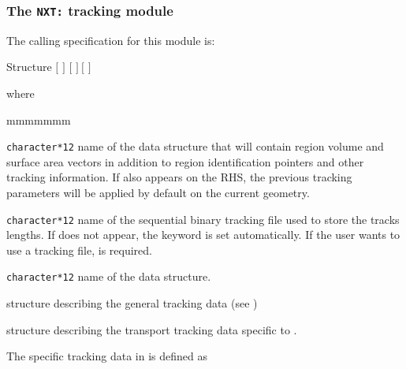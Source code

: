 \subsubsection{The {\tt NXT:} tracking module}\label{sect:NXTData}

The calling specification for this module is:

\begin{DataStructure}{Structure }
$[$  $]$ 
\moc{:=}  $[$  $]~[$  $]$ \moc{::}  
\end{DataStructure}

\noindent  where
\begin{ListeDeDescription}{mmmmmmm}

\item[\dusa{TRKNAM}] {\tt character*12} name of the  data
structure that will contain region volume and surface area vectors in
addition to region identification pointers and other tracking information.
If  also appears on the RHS, the previous tracking 
parameters will be applied by default on the current geometry.

\item[\dusa{TRKFIL}] {\tt character*12} name of the sequential binary tracking
file  used to store the tracks lengths. If  does not appear, the keyword
 is set automatically. If the user wants to use a tracking file,
 is required.

\item[\dusa{GEONAM}] {\tt character*12} name of the  data
structure.

\item[\dstr{desctrack}] structure describing the general tracking data (see
)

\item[\dstr{descnxt}] structure describing the transport tracking data
specific to .

\end{ListeDeDescription}

\vskip 0.15cm

The  specific tracking data in  is defined as

